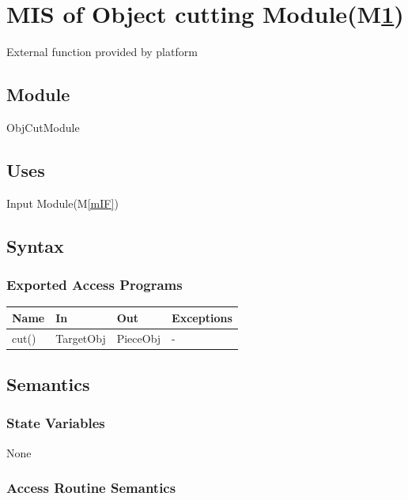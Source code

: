 \documentclass[12pt, titlepage]{article}
\newcommand{\mref}[1]{M\ref{#1}}
\begin{document}
\section{MIS of Object cutting Module(\mref{mOC})} \label{mOC}

External function provided by platform

\subsection{Module}

ObjCutModule

\subsection{Uses}

Input Module(\mref{mIF})

\subsection{Syntax}

\subsubsection{Exported Access Programs}

\begin{center}
	\begin{tabular}{p{2cm} p{4cm} p{4cm} p{2cm}}
		\hline
		\textbf{Name} & \textbf{In} & \textbf{Out} & \textbf{Exceptions} \\
		\hline
		cut() & TargetObj & PieceObj & - \\
		\hline
	\end{tabular}
\end{center}

\subsection{Semantics}

\subsubsection{State Variables}

None

\subsubsection{Access Routine Semantics}
\end{document}
